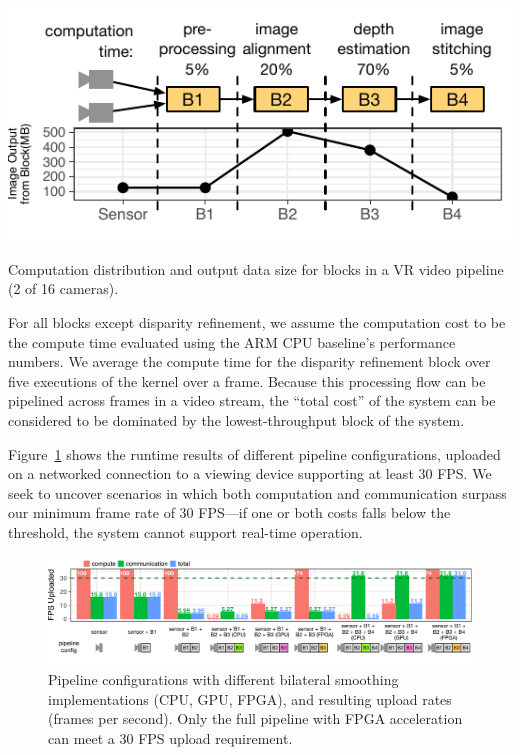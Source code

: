 \begin{marginfigure}
\centering
    \begin{center}
\includegraphics[width=\textwidth]{nsp-figs/vr_input_data.pdf}
    \end{center}
    \caption{Computation distribution and output data size for blocks in a VR video pipeline (2 of 16 cameras). }
    \label{fig:vr-data-scale}
\end{marginfigure}

For all blocks except disparity refinement, we assume the computation cost to be the compute time evaluated using the ARM CPU baseline's performance numbers. We average the compute time for the disparity refinement block over five executions of the kernel over a frame. Because this processing flow can be pipelined across frames in a video stream, the ``total cost'' of the system can be considered to be dominated by the lowest-throughput block of the system.

Figure~\ref{fig:vr-fps} shows the runtime results of different pipeline configurations, uploaded on a networked connection to a viewing device supporting at least 30 FPS. We seek to uncover scenarios in which both computation and communication surpass our minimum frame rate of 30 FPS---if one or both costs falls below the threshold, the system cannot support real-time operation.

\begin{figure}[h]
\centering
    \begin{center}
\includegraphics[width=1.0\textwidth]{nsp-figs/vr_compute_transfer.pdf}
    \end{center}
    \caption{Pipeline configurations with different bilateral smoothing implementations (CPU, GPU, FPGA), and resulting upload rates (frames per second). Only the full pipeline with FPGA acceleration can meet a 30 FPS upload requirement.}
    \label{fig:vr-fps}
\end{figure}


